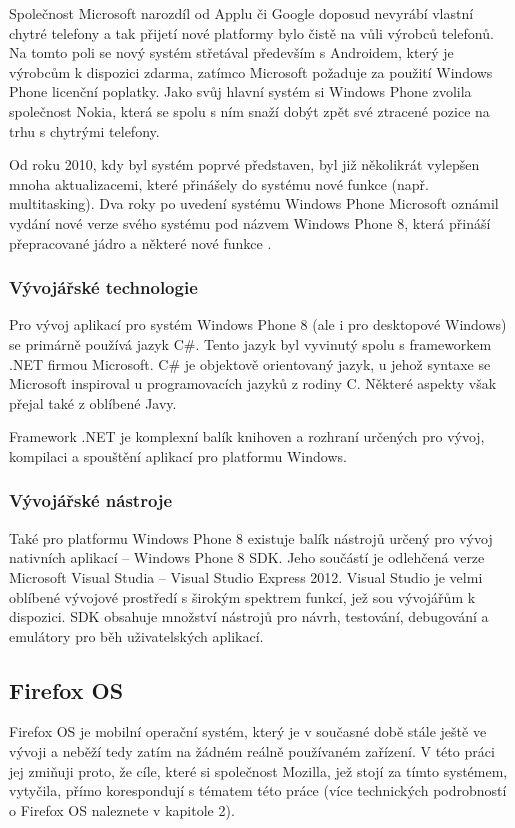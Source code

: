 Společnost Microsoft narozdíl od Applu či Google doposud nevyrábí vlastní chytré telefony a tak přijetí nové platformy bylo čistě na vůli výrobců telefonů. Na tomto poli se nový systém střetával především s Androidem, který je výrobcům k dispozici zdarma, zatímco Microsoft požaduje za použití Windows Phone licenční poplatky. Jako svůj hlavní systém si Windows Phone zvolila společnost Nokia, která se spolu s ním snaží dobýt zpět své ztracené pozice na trhu s chytrými telefony.

Od roku 2010, kdy byl systém poprvé představen, byl již několikrát vylepšen mnoha aktualizacemi, které přinášely do systému nové funkce (např. multitasking). Dva roky po uvedení systému Windows Phone Microsoft oznámil vydání nové verze svého systému pod názvem Windows Phone 8, která přináší přepracované jádro a některé nové funkce \cite{ms_unveils_wp8}.

\subsubsection{Vývojářské technologie}
Pro vývoj aplikací pro systém Windows Phone 8 (ale i pro desktopové Windows) se primárně používá jazyk C\#. Tento jazyk byl vyvinutý spolu s frameworkem .NET firmou Microsoft. C\# je objektově orientovaný jazyk, u jehož syntaxe se Microsoft inspiroval u programovacích jazyků z rodiny C. Některé aspekty však přejal také z oblíbené Javy.

Framework .NET je komplexní balík knihoven a rozhraní určených pro vývoj, kompilaci a spouštění aplikací pro platformu Windows.

\subsubsection{Vývojářské nástroje}
Také pro platformu Windows Phone 8 existuje balík nástrojů určený pro vývoj nativních aplikací – Windows Phone 8 SDK. Jeho součástí je odlehčená verze Microsoft Visual Studia – Visual Studio Express 2012. Visual Studio je velmi oblíbené vývojové prostředí s širokým spektrem funkcí, jež sou vývojářům k dispozici. SDK obsahuje množství nástrojů pro návrh, testování, debugování a emulátory pro běh uživatelských aplikací.

\subsection{Firefox OS}
Firefox OS je mobilní operační systém, který je v současné době stále ještě ve vývoji a neběží tedy zatím na žádném reálně používaném zařízení. V této práci jej zmiňuji proto, že cíle, které si společnost Mozilla, jež stojí za tímto systémem, vytyčila, přímo korespondují s tématem této práce (více technických podrobností o Firefox OS naleznete v kapitole 2).

